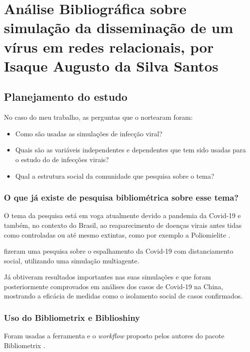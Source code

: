 \chapter{Análise Bibliográfica sobre simulação da disseminação de um vírus em redes relacionais, por Isaque Augusto da Silva Santos\label{chap:bibliometria:seraphritt}}

\section{Planejamento do estudo\label{ESS@seraphritt:questoes}}

No caso do meu trabalho, as perguntas que o nortearam foram:
\begin{itemize}
    \item Como são usadas as simulações de infecção viral? 
    \item Quais são as variáveis independentes e dependentes que tem sido usadas para o estudo do de infecções virais? 
    \item Qual a estrutura social da comunidade que pesquisa sobre o tema?
\end{itemize}

\subsection{O que já existe de pesquisa bibliométrica sobre esse tema?}

O tema da pesquisa está em voga atualmente devido a pandemia da Covid-19 e também, no contexto do Brasil, ao reaparecimento de doenças virais antes tidas como controladas ou até mesmo extintas, como por exemplo a Poliomielite \cite{mckeever_poliomielite_2022}. 

\cite{maheshwari_network_2020} fizeram uma pesquisa sobre o espalhamento da Covid-19 com distanciamento social, utilizando uma simulação multiagente.

Já \cite{wang_epidemic_2022} obtiveram resultados importantes nas suas simulações e que foram posteriormente comprovados em análises dos casos de Covid-19 na China, mostrando a eficácia de medidas como o isolamento social de casos confirmados.

\subsection{Uso do Bibliometrix e Biblioshiny}

Foram usadas a ferramenta e o \textit{workflow} proposto pelos autores do pacote Bibliometrix \cite{aria_bibliometrix_2017}.

